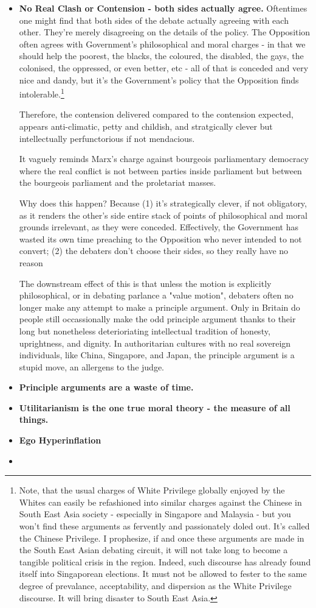 \begin{itemize}
\item \textbf{No Real Clash or Contension - both sides actually agree.} Oftentimes one might find that both sides of the debate actually agreeing with each other. They're merely disagreeing on the details of the policy. The Opposition often agrees with Government's philosophical and moral charges - in that we should help the poorest, the blacks, the coloured, the disabled, the gays, the colonised, the oppressed, or even better, etc - all of that is conceded and very nice and dandy, but it's the Government's policy that the Opposition finds intolerable.\footnote{Note, that the usual charges of White Privilege globally enjoyed by the Whites can easily be refashioned into similar charges against the Chinese in South East Asia society - especially in Singapore and Malaysia - but you won't find these arguments as fervently and passionately doled out. It's called the Chinese Privilege. I prophesize, if and once these arguments are made in the South East Asian debating circuit, it will not take long to become a tangible political crisis in the region. Indeed, such discourse has already found itself into Singaporean elections. It must not be allowed to fester to the same degree of prevalance, acceptability, and dispersion as the White Privilege discourse. It will bring disaster to South East Asia.}
    
    Therefore, the contension delivered compared to the contension expected, appears anti-climatic, petty and childish, and stratgically clever but intellectually perfunctorious if not mendacious.  

    It vaguely reminds Marx's charge against bourgeois parliamentary democracy where the real conflict is not between parties inside parliament but between the bourgeois parliament and the proletariat masses.

    Why does this happen? Because (1) it's strategically clever, if not obligatory, as it renders the other's side entire stack of points of philosophical and moral grounds irrelevant, as they were conceded. Effectively, the Government has wasted its own time preaching to the Opposition who never intended to not convert; (2) the debaters don't choose their sides, so they really have no reason 

    The downstream effect of this is that unless the motion is explicitly philosophical, or in debating parlance a "value motion", debaters often no longer make any attempt to make a principle argument. Only in Britain do people still occassionally make the odd principle argument thanks to their long but nonetheless deterioriating intellectual tradition of honesty, uprightness, and dignity. In authoritarian cultures with no real sovereign individuals, like China, Singapore, and Japan, the principle argument is a stupid move, an allergens to the judge.

    \item \textbf{Principle arguments are a waste of time.}
    \item \textbf{Utilitarianism is the one true moral theory - the measure of all things.}
    \item \textbf{Ego Hyperinflation} 
    \item 
\end{itemize}

